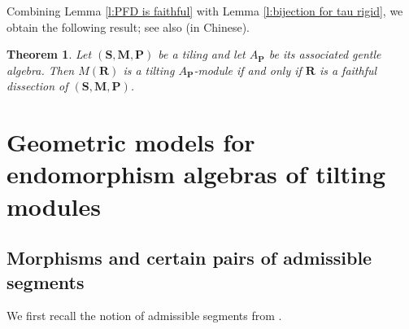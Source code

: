 \documentclass[a4paper,10pt]{amsart}
\theoremstyle{plain}          %
\newtheorem{theorem}{Theorem}[section]
\theoremstyle{definition}
\def\SS{\mathbf{S}}
\def\af{\mathbf{a}}
\def\Pf{\mathbf{P}}
\def\MM{\mathbf{M}}
\def\PP{\mathbf{P}}
\def\MM{\mathbf{M}}
\newcommand{\FPD}{\mathbf{FPD}}
\begin{document}
Combining Lemma \ref{l:PFD is faithful} with Lemma \ref{l:bijection for tau rigid}, we obtain the following result; see also \cite{Nie} (in Chinese). 
\begin{theorem}\label{t: tilting modules and faithful dissection}
	Let $(\SS,\MM,\PP)$ be a tiling and let $A_\Pf$ be its associated gentle algebra. Then $M(\mathbf{R})$ is a tilting $A_{\PP}$-module if and only if  $\mathbf{R}$ is a faithful dissection of $(\SS,\MM,\PP)$.
\end{theorem}
  
\section{Geometric models for endomorphism algebras of tilting modules}\label{s: end algebra}

\subsection{Morphisms and certain pairs of admissible segments}
We first recall the notion of admissible segments from \cite[Definition 3.18]{BS}.
\end{document}
